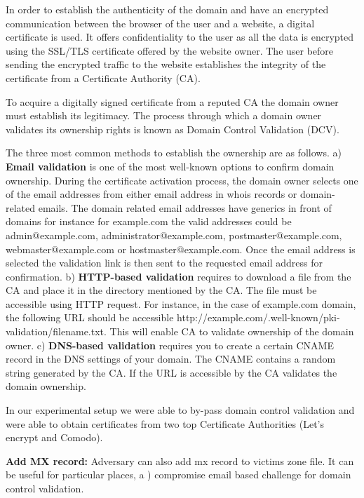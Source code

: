 In order to establish the authenticity of the domain and have an encrypted communication between the browser of the user and a website, a digital certificate is used. It offers confidentiality to the user as all the data is encrypted using the SSL/TLS certificate offered by the website owner. The user before sending the encrypted traffic to the website establishes the integrity of the certificate from a  Certificate Authority (CA). 

To acquire a digitally signed certificate from a reputed CA  the domain owner must establish its legitimacy. The process through which a  domain owner validates its ownership rights is known as Domain Control Validation (DCV). 

The three most common methods to establish the ownership are as follows. 
a) \textbf {Email validation} is one of the most well-known options to confirm domain ownership. During the certificate activation process, the domain owner selects one of the email addresses from either email address in whois records or domain-related emails. The domain related email addresses have generics in front of domains for instance for example.com  the valid addresses could be admin@example.com, administrator@example.com, postmaster@example.com, webmaster@example.com or hostmaster@example.com. Once the email address is selected the validation link is then sent to the requested email address for confirmation. b) \textbf{HTTP-based validation} requires to download a file from the CA and place it in the directory mentioned by the CA. The file must be accessible using HTTP request. For instance, in the case of example.com domain, the following URL should be accessible http://example.com/.well-known/pki-validation/filename.txt. This will enable CA to validate ownership of the domain owner. c) \textbf{DNS-based validation} requires you to create a certain CNAME record in the DNS settings of your domain. The CNAME contains a random string generated by the CA. If the URL is accessible by the CA validates the domain ownership. 


In our experimental setup we were able to by-pass domain control validation and were able to obtain certificates from two top Certificate Authorities (Let's encrypt and Comodo). %

\textbf{ Add MX record:} 
Adversary can also add mx record to victims zone file. It can be useful for particular places, a ) compromise email based challenge for domain control validation. %


